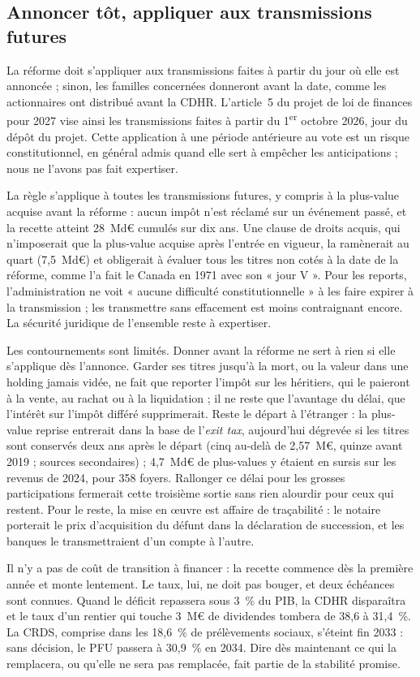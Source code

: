 \subsection{Annoncer tôt, appliquer aux transmissions futures}\label{sec:pfu_transition}

La réforme doit s'appliquer aux transmissions faites à partir du jour où elle est annoncée ; sinon, les familles
concernées donneront avant la date, comme les actionnaires ont distribué avant la CDHR. L'article~5 du projet de loi
de finances pour 2027 vise ainsi les transmissions faites à partir du 1\textsuperscript{er} octobre 2026, jour du
dépôt du projet. Cette application à une période antérieure au vote est un risque constitutionnel, en général admis
quand elle sert à empêcher les anticipations ; nous ne l'avons pas fait expertiser.

La règle s'applique à toutes les transmissions futures, y compris à la plus-value acquise avant la réforme : aucun
impôt n'est réclamé sur un événement passé, et la recette atteint 28~Md€ cumulés sur dix ans. Une clause de droits
acquis, qui n'imposerait que la plus-value acquise après l'entrée en vigueur, la ramènerait au quart (7,5~Md€) et
obligerait à évaluer tous les titres non cotés à la date de la réforme, comme l'a fait le Canada en 1971 avec son
« jour V ». Pour les reports, l'administration ne voit « aucune difficulté constitutionnelle » à les faire expirer à
la transmission ; les transmettre sans effacement est moins contraignant encore. La sécurité juridique de l'ensemble
reste à expertiser.

Les contournements sont limités. Donner avant la réforme ne sert à rien si elle s'applique dès l'annonce. Garder ses
titres jusqu'à la mort, ou la valeur dans une holding jamais vidée, ne fait que reporter l'impôt sur les héritiers,
qui le paieront à la vente, au rachat ou à la liquidation ; il ne reste que l'avantage du délai, que l'intérêt sur
l'impôt différé supprimerait. Reste le départ à l'étranger : la plus-value reprise entrerait dans la base de
l'\emph{exit tax}, aujourd'hui dégrevée si les titres sont conservés deux ans après le départ (cinq au-delà de
2,57~M€, quinze avant 2019 ; sources secondaires) ; 4,7~Md€ de plus-values y étaient en sursis sur les revenus de
2024, pour 358 foyers. Rallonger ce délai pour les grosses participations fermerait cette troisième sortie sans rien
alourdir pour ceux qui restent. Pour le reste, la mise en œuvre est affaire de traçabilité : le notaire porterait le
prix d'acquisition du défunt dans la déclaration de succession, et les banques le transmettraient d'un compte à
l'autre.

Il n'y a pas de coût de transition à financer : la recette commence dès la première année et monte lentement. Le
taux, lui, ne doit pas bouger, et deux échéances sont connues. Quand le déficit repassera sous 3~\% du PIB, la CDHR
disparaîtra et le taux d'un rentier qui touche 3~M€ de dividendes tombera de 38,6 à 31,4~\%. La CRDS, comprise dans
les 18,6~\% de prélèvements sociaux, s'éteint fin 2033 : sans décision, le PFU passera à 30,9~\% en 2034. Dire dès
maintenant ce qui la remplacera, ou qu'elle ne sera pas remplacée, fait partie de la stabilité promise.
